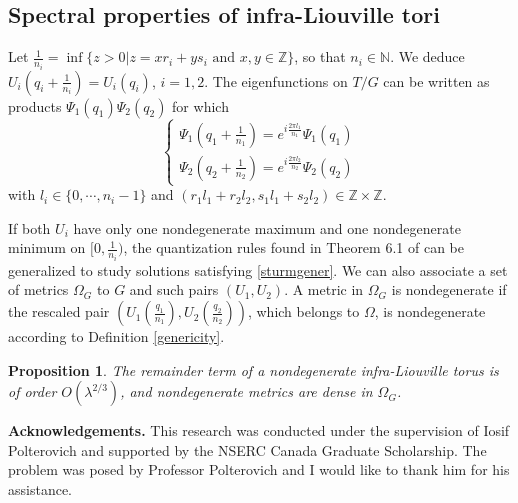 \documentclass[12pt]{amsart}
\numberwithin{equation}{subsection}
\theoremstyle{definition}
\theoremstyle{plain}
\newtheorem{prop}[equation]{Proposition}
\begin{document}
\subsection{Spectral properties of infra-Liouville tori}
Let $\frac{1}{n_i} = \inf \{z > 0 | z = x r_i + y s_i \text{ and } x,y \in \mathbb{Z} \} $, so that
$n_i \in \mathbb{N}$.
We deduce $U_i(q_i+\frac{1}{n_i})=U_i(q_i)$, $i=1,2$.
The eigenfunctions on $T/G$ can be written as products $\Psi_1(q_1)\Psi_2(q_2)$ for which
\begin{equation}
\label{sturmgener}
\begin{cases}
\Psi_1(q_1+\frac{1}{n_1}) = e^{i\frac{2\pi l_1 }{n_1}}\Psi_1(q_1)\\
\Psi_2(q_2+\frac{1}{n_2}) = e^{i\frac{2\pi l_2 }{n_2}}\Psi_2(q_2)
\end{cases}
\end{equation}
with $l_i \in \{0, \cdots, n_i-1\}$ and $(r_1 l_1 + r_2 l_2,s_1 l_1 + s_2 l_2) \in \mathbb{Z} \times \mathbb{Z}$.

If both $U_i$ have only one nondegenerate maximum and one nondegenerate minimum
on $[0,\frac{1}{n_i})$, the quantization rules found in Theorem 6.1 of \cite{1} can be generalized to
study solutions satisfying \eqref{sturmgener}. We can also associate a set of metrics $\Omega_G$ to $G$
and such pairs $(U_1,U_2)$. A metric in $\Omega_G$ is nondegenerate if the rescaled pair $\left(U_1 \left(\frac{q_1}{n_1} \right),U_2 \left(\frac{q_2}{n_2} \right) \right )$, which belongs to $\Omega$,
is nondegenerate according to Definition \ref{genericity}.
\begin{prop}
The remainder term of a nondegenerate infra-Liouville torus is of order $O(\lambda^{2/3})$,
and nondegenerate metrics are dense in $\Omega_G$.
\end{prop}

\textbf{Acknowledgements.} This research was conducted under the
supervision of Iosif Polterovich and supported by the NSERC Canada Graduate Scholarship. The problem was posed by Professor
Polterovich and I would like to thank him for his assistance.

\bigskip
\end{document}
